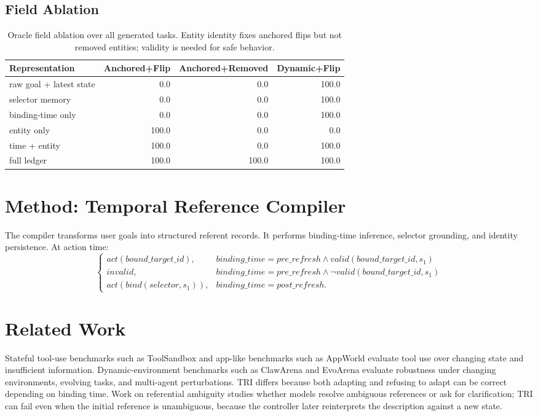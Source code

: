 \documentclass[11pt]{article}
\begin{document}
\subsection{Field Ablation}

\begin{table}[h]
\centering
\small
\begin{tabular}{lrrr}
\toprule
Representation & Anchored+Flip & Anchored+Removed & Dynamic+Flip \\
\midrule
raw goal + latest state & 0.0 & 0.0 & 100.0 \\
selector memory & 0.0 & 0.0 & 100.0 \\
binding-time only & 0.0 & 0.0 & 100.0 \\
entity only & 100.0 & 0.0 & 0.0 \\
time + entity & 100.0 & 0.0 & 100.0 \\
full ledger & 100.0 & 100.0 & 100.0 \\
\bottomrule
\end{tabular}
\caption{Oracle field ablation over all generated tasks. Entity identity fixes anchored flips but not removed entities; validity is needed for safe behavior.}
\end{table}

\section{Method: Temporal Reference Compiler}

The compiler transforms user goals into structured referent records. It performs binding-time inference, selector grounding, and identity persistence. At action time:
\[
\begin{cases}
act(bound\_target\_id), & binding\_time = pre\_refresh \land valid(bound\_target\_id,s_1) \\
invalid, & binding\_time = pre\_refresh \land \neg valid(bound\_target\_id,s_1) \\
act(bind(selector,s_1)), & binding\_time = post\_refresh.
\end{cases}
\]

\section{Related Work}

Stateful tool-use benchmarks such as ToolSandbox and app-like benchmarks such as AppWorld evaluate tool use over changing state and insufficient information. Dynamic-environment benchmarks such as ClawArena and EvoArena evaluate robustness under changing environments, evolving tasks, and multi-agent perturbations. TRI differs because both adapting and refusing to adapt can be correct depending on binding time. Work on referential ambiguity studies whether models resolve ambiguous references or ask for clarification; TRI can fail even when the initial reference is unambiguous, because the controller later reinterprets the description against a new state.
\end{document}
